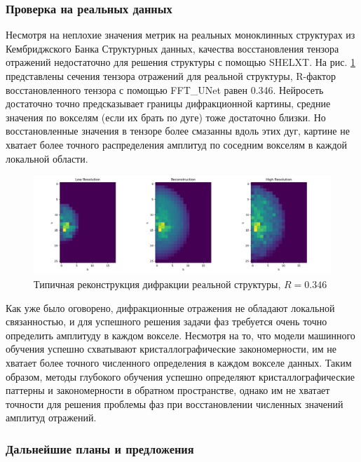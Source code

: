 \subsubsection*{Проверка на реальных данных}

Несмотря на неплохие значения метрик на реальных моноклинных структурах из Кембриджского Банка Структурных данных, качества восстановления тензора отражений недостаточно для решения структуры с помощью SHELXT. На рис. \ref{recon_ex} представлены сечения тензора отражений для реальной структуры, R-фактор восстановленного тензора с помощью FFT\_UNet равен 0.346. Нейросеть достаточно точно предсказывает границы дифракционной картины, средние значения по вокселям (если их брать по дуге) тоже достаточно близки. Но восстановленные значения в тензоре более смазанны вдоль этих дуг, картине не хватает более точного распределения амплитуд по соседним вокселям в каждой локальной области. 

\begin{figure}[H]
    \centering
    \includegraphics[width=1\textwidth]{figures/recon_example.png}
    \caption{Типичная реконструкция дифракции реальной структуры, $R = 0.346$}
    \label{recon_ex}
\end{figure}

Как уже было оговорено, дифракционные отражения не обладают локальной связанностью, и для успешного решения задачи фаз требуется очень точно определить амплитуду в каждом вокселе. Несмотря на то, что модели машинного обучения успешно схватывают кристаллографические закономерности, им не хватает более точного численного определения в каждом вокселе данных. Таким образом, методы глубокого обучения успешно определяют кристаллографические паттерны и закономерности в обратном пространстве, однако им не хватает точности для решения проблемы фаз при восстановлении численных значений амплитуд отражений.

\subsubsection*{Дальнейшие планы и предложения}

